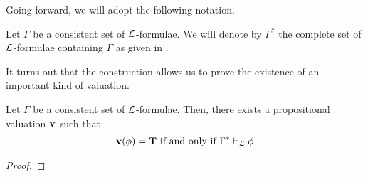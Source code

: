 Going forward, we will adopt the following notation.
\begin{boxconvention}
    Let $\Gamma$ be a consistent set of $\mathcal{L}$-formulae. We will denote by $\Gamma^*$ the complete set of $\mathcal{L}$-formulae containing $\Gamma$ as given in .
\end{boxconvention}

It turns out that the construction allows us to prove the existence of an important kind of valuation.

\begin{boxproposition}
    Let $\Gamma$ be a consistent set of $\mathcal{L}$-formulae. Then, there exists a propositional valuation $\mathbf{v}$ such that
    \begin{align*}
        \mathbf{v}\!\left( \phi \right) = \mathbf{T} \text{ if and only if } \Gamma^* \vdash_{\mathcal{L}} \phi
    \end{align*}
\end{boxproposition}
\begin{proof}
    \sorry
\end{proof}


